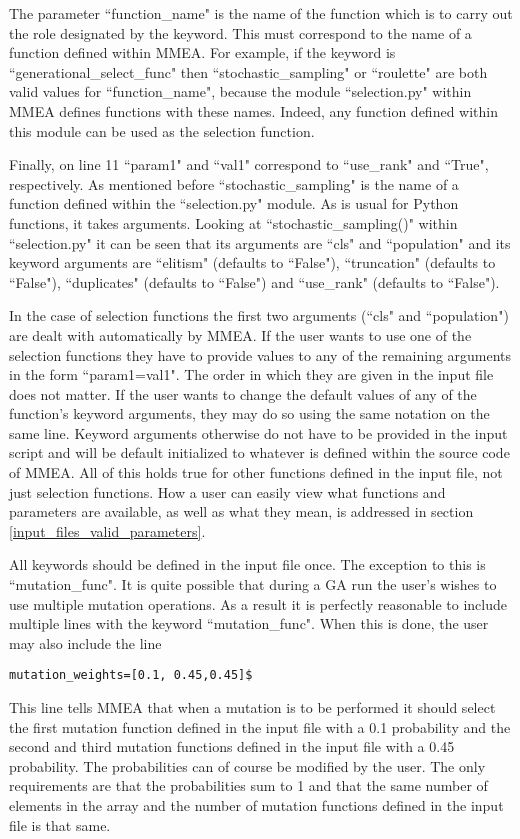 \documentclass{article}
\begin{document}
The parameter ``function\_name" is the name of the function which is to carry out the role designated by the keyword. This must correspond to the name of a function defined within MMEA. For example, if the keyword is ``generational\_select\_func" then ``stochastic\_sampling" or ``roulette" are both valid values for ``function\_name", because the module ``selection.py" within MMEA defines functions with these names. Indeed, any function defined within this module can be used as the selection function.

Finally, on line 11 ``param1" and ``val1" correspond to ``use\_rank" and ``True", respectively. As mentioned before ``stochastic\_sampling" is the name of a function defined within the ``selection.py" module. As is usual for Python functions, it takes arguments. Looking at ``stochastic\_sampling()" within ``selection.py" it can be seen that its arguments are ``cls" and ``population" and its keyword arguments are ``elitism" (defaults to ``False"), ``truncation" (defaults to ``False"), ``duplicates" (defaults to ``False") and ``use\_rank" (defaults to ``False").

In the case of selection functions the first two arguments (``cls" and ``population") are dealt with automatically by MMEA. If the user wants to use one of the selection functions they have to provide values to any of the remaining arguments in the form ``param1=val1". The order in which they are given in the input file does not matter. If the user wants to change the default values of any of the function's keyword arguments, they may do so using the same notation on the same line. Keyword arguments otherwise do not have to be provided in the input script and will be default initialized to whatever is defined within the source code of MMEA. All of this holds true for other functions defined in the input file, not just selection functions. How a user can easily view what functions and parameters are available, as well as what they mean, is addressed in section \ref{input_files_valid_parameters}.

All keywords should be defined in the input file once. The exception to this is ``mutation\_func". It is quite possible that during a GA run the user's wishes to use multiple mutation operations. As a result it is perfectly reasonable to include multiple lines with the keyword  ``mutation\_func". When this is done, the user may also include the line 
\begin{verbatim}
mutation_weights=[0.1, 0.45,0.45]$
\end{verbatim}
This line tells MMEA that when a mutation is to be performed it should select the first mutation function defined in the input file with a 0.1 probability and the second and third mutation functions defined in the input file with a 0.45 probability. The probabilities can of course be modified by the user. The only requirements are that the probabilities sum to 1 and that the same number of elements in the array and the number of mutation functions defined in the input file is that same.
\end{document}
